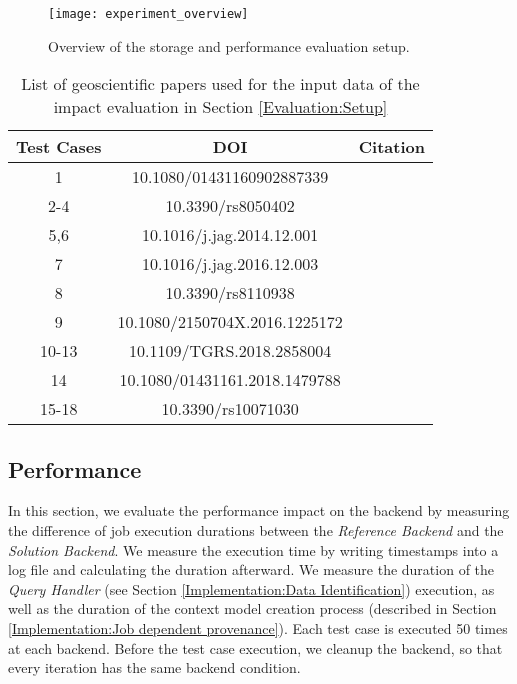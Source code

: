 \documentclass[draft,final]{vutinfth} %
\begin{document}
\begin{figure}[h]
	\centering
	\texttt{[image: experiment\_overview]}
	\caption{Overview of the storage and performance evaluation setup.}
	\label{fig:experiment_overview} %
\end{figure}

\begin{table}[]
	\caption{List of geoscientific papers used for the input data of the impact evaluation in Section \ref{Evaluation:Setup}}
	\centering
	\begin{tabular}{c|c|c}
		\textbf{Test Cases} & \textbf{DOI} & \textbf{Citation}  \\ \hline
		1 & 10.1080/01431160902887339 & \cite{evaluation1} \\ 
		2-4 & 10.3390/rs8050402 & \cite{evaluation2} \\ 
		5,6 & 10.1016/j.jag.2014.12.001  & \cite{evaluation3} \\
		7 & 10.1016/j.jag.2016.12.003  & \cite{evaluation4} \\
		8 & 10.3390/rs8110938  & \cite{evaluation5} \\
		9 & 10.1080/2150704X.2016.1225172  & \cite{evaluation6} \\
		10-13 & 10.1109/TGRS.2018.2858004  & \cite{evaluation7} \\
		14 & 10.1080/01431161.2018.1479788  & \cite{evaluation8} \\
		15-18 & 10.3390/rs10071030  & \cite{evaluation9} \\
	\end{tabular}
	\label{Tab:appendix}
\end{table}

\subsection{Performance}\label{Evaluation:impact_perf}

In this section, we evaluate the performance impact on the backend by measuring the difference of job execution durations between the \textit{Reference Backend} and the \textit{Solution Backend}. We measure the execution time by writing timestamps into a log file and calculating the duration afterward. We measure the duration of the \textit{Query Handler} (see Section \ref{Implementation:Data Identification}) execution, as well as the duration of the context model creation process (described in Section \ref{Implementation:Job dependent provenance}). Each test case is executed 50 times at each backend. Before the test case execution, we cleanup the backend, so that every iteration has the same backend condition. 
\end{document}
